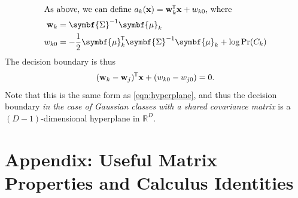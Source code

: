 \documentclass[11pt]{article}
\newcommand{\xb}{\mathbf{x}}
\newcommand{\ub}{\symbf{\mu}}
\newcommand{\Sb}{\symbf{\Sigma}}
\newcommand*{\tran}{^{\mkern-1.5mu\mathsf{T}}}
\begin{document}
\begin{align*}
	\intertext{As above, we can define $a_k(\xb) = \mathbf{w}_k\tran \xb + w_{k0}$, where}
	\mathbf{w}_k &= \Sb^{-1} \ub_k \\
	w_{k0} &= - \frac{1}{2} \ub_k \tran \Sb^{-1} \ub_k + \log \Pr(C_k)
\end{align*}
The decision boundary is thus
\begin{equation}
	(\mathbf{w}_k - \mathbf{w}_j)\tran \xb + (w_{k0} - w_{j0})  = 0.
\end{equation}
Note that this is the same form as \eqref{eqn:hyperplane}, and thus the decision boundary \textit{in the case of Gaussian classes
with a shared covariance matrix} is a $(D-1)$-dimensional hyperplane in $\mathbb{R}^D$.

\pagebreak
\section*{Appendix: Useful Matrix Properties and Calculus Identities}
$\quad$
\end{document}
